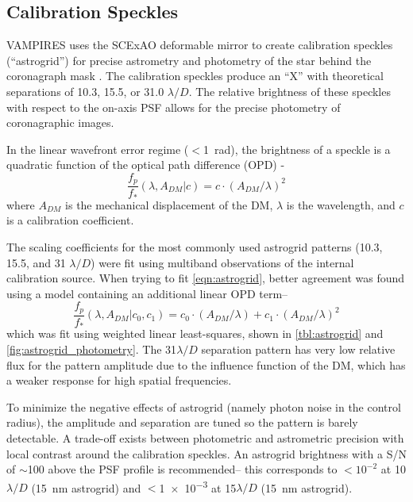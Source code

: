 \subsection{Calibration Speckles}\label{sec:astrogrid}

VAMPIRES uses the SCExAO deformable mirror to create calibration speckles (``astrogrid'') for precise astrometry and photometry of the star behind the coronagraph mask \citep{sahoo_precision_2020}. The calibration speckles produce an ``X'' with theoretical separations of 10.3, 15.5, or 31.0 $\lambda/D$. The relative brightness of these speckles with respect to the on-axis PSF allows for the precise photometry of coronagraphic images.

In the linear wavefront error regime ($<$\SI{1}{\radian}), the brightness of a speckle is a quadratic function of the optical path difference (OPD) \citep{sahoo_precision_2020,chen_post-processing_2023,follette_introduction_2023}-
\begin{equation}
    \label{eqn:astrogrid}
    \frac{f_p}{f_*}\left( \lambda, A_{DM} | c \right) = c \cdot \left(A_{DM} / \lambda\right)^2
\end{equation}
where $A_{DM}$ is the mechanical displacement of the DM, $\lambda$ is the wavelength, and $c$ is a calibration coefficient. 

The scaling coefficients for the most commonly used astrogrid patterns (10.3, 15.5, and 31 $\lambda/D$) were fit using multiband observations of the internal calibration source. When trying to fit \autoref{eqn:astrogrid}, better agreement was found using a model containing an additional linear OPD term--
\begin{equation}
    \label{eqn:astrogridmod}
    \frac{f_p}{f_*}\left( \lambda, A_{DM} | c_0, c_1 \right) = c_0 \cdot \left(A_{DM} / \lambda\right) + c_1 \cdot \left(A_{DM} / \lambda\right)^2
\end{equation}
which was fit using weighted linear least-squares, shown in \autoref{tbl:astrogrid} and \autoref{fig:astrogrid_photometry}. The 31$\lambda/D$ separation pattern has very low relative flux for the pattern amplitude due to the influence function of the DM, which has a weaker response for high spatial frequencies.

To minimize the negative effects of astrogrid (namely photon noise in the control radius), the amplitude and separation are tuned so the pattern is barely detectable. A trade-off exists between photometric and astrometric precision with local contrast around the calibration speckles. An astrogrid brightness with a S/N of $\sim$100 above the PSF profile is recommended-- this corresponds to $<10^{-2}$ at 10$\lambda/D$ (\SI{15}{\nano\meter} astrogrid) and $<$\num{1e-3} at 15$\lambda/D$ (\SI{15}{\nano\meter} astrogrid).

